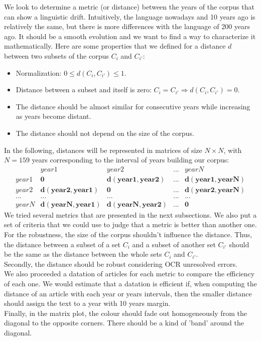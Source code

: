 
We look to determine a metric (or distance) between the years of the corpus that can show a linguistic drift. Intuitively, the language nowadays and 10 years ago is relatively the same, but there is more differences with the language of 200 years ago. It should be a smooth evolution and we want to find a way to characterize it mathematically. Here are some properties that we defined for a distance $d$ between two subsets of the corpus $C_i$ and $C_{i'}$:

\begin{itemize}
 \item Normalization: $0 \leq d(C_i,C_{i'}) \leq 1$.
 \item Distance between a subset and itself is zero: $C_i = C_{i'} \Rightarrow d(C_i,C_{i'}) = 0$.
 \item The distance should be almost similar for consecutive years while increasing as years become distant.
 \item The distance should not depend on the size of the corpus.
\end{itemize}

In the following, distances will be represented in matrices of size $N \times N$, with $N = 159$ years corresponding to the interval of years building our corpus:
\[
\begin{matrix}
 & year1 & year2 & ... & yearN \\
 year1 & \mathbf{0} & \mathbf{d(year1,year2)} & ... & \mathbf{d(year1,yearN)} \\
 year2 & \mathbf{d(year2,year1)} & \mathbf{0} & ... & \mathbf{d(year2,yearN)} \\
 ... & ... & ... & ... & ... \\
 yearN & \mathbf{d(yearN,year1)} & \mathbf{d(yearN,year2)} & ... & \mathbf{0}
\end{matrix}
\]
We tried several metrics that are presented in the next subsections. We also put a set of criteria that we could use to judge that a metric is better than another one.\\
For the robustness, the size of the corpus shouldn't influence the distance. Thus, the distance between a subset of a set $C_i$ and a subset of another set $C_{i'}$ should be the same as the distance between the whole sets $C_i$ and $C_{i'}$.\\
Secondly, the distance should be robust considering OCR unresolved errors.\\
We also proceeded a datation of articles for each metric to compare the efficiency of each one. We would estimate that a datation is efficient if, when computing the distance of an article with each year or years intervals, then the smaller distance should assign the text to a year with 10 years margin.\\
Finally, in the matrix plot, the colour should fade out homogeneously from the diagonal to the opposite corners. There should be a kind of 'band' around the diagonal.
